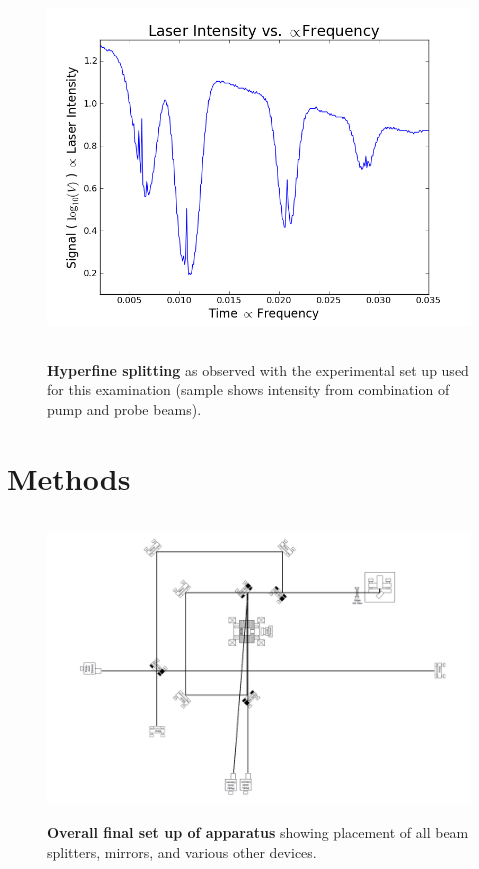 \documentclass[paper=a4, fontsize=11pt]{scrartcl} %
\numberwithin{equation}{section}
\numberwithin{figure}{section}
\numberwithin{table}{section}
\begin{document}
\begin{figure}[H] \begin{center}
  \includegraphics[height=100mm]{3-1-001.png}
  \caption{\textbf{Hyperfine splitting} as observed with the experimental set up used for this examination (sample shows intensity from combination of pump and probe beams). }
  \label{fig:absorb1}
\end{center} \end{figure}



\section{Methods}

\begin{figure}[H] \begin{center}
  \includegraphics[height=80mm]{full.png}
  \caption{\textbf{Overall final set up of apparatus} showing placement of all beam splitters, mirrors, and various other devices. }
  \label{fig:absorb1}
\end{center} \end{figure}
\end{document}
